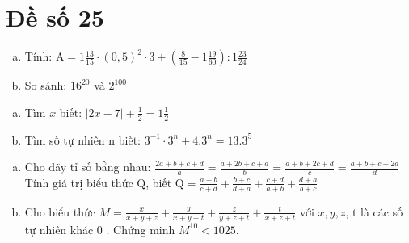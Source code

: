 \onehalfspacing
\section{Đề số 25}
\graphicspath{{./img/}}
\begin{bt} 
    \hfill
   \begin{enumerate}[a.]
    \item Tính: $\mathrm{A}=1 \frac{13}{15} \cdot(0,5)^2 \cdot 3+\left(\frac{8}{15}-1 \frac{19}{60}\right): 1 \frac{23}{24}$
    \item So sánh: $16^{20}$ và $2^{100}$
   \end{enumerate}
\loigiai{}
\end{bt}

\begin{bt}
    \hfill
	\begin{enumerate}[a.]
        \item Tìm $x$ biết: $|2 x-7|+\frac{1}{2}=1 \frac{1}{2}$
        \item Tìm số tự nhiên $\mathrm{n}$ biết: $3^{-1} \cdot 3^n+4.3^n=13.3^5$
    \end{enumerate}
	\loigiai{} 
\end{bt}

\begin{bt}
    \hfill
    \begin{enumerate}[a.]
        \item Cho dãy tỉ số bằng nhau: $\frac{2 a+b+c+d}{a}=\frac{a+2 b+c+d}{b}=\frac{a+b+2 c+d}{c}=\frac{a+b+c+2 d}{d}$ Tính giá trị biểu thức $\mathrm{Q}$, biết $\mathrm{Q}=\frac{a+b}{c+d}+\frac{b+c}{d+a}+\frac{c+d}{a+b}+\frac{d+a}{b+c}$
        \item Cho biểu thức $M=\frac{x}{x+y+z}+\frac{y}{x+y+t}+\frac{z}{y+z+t}+\frac{t}{x+z+t}$ với $x, y, z$, t là các số tự nhiên khác 0 . Chứng minh $M^{10}<1025$.
    \end{enumerate}
	\loigiai{}
\end{bt}

